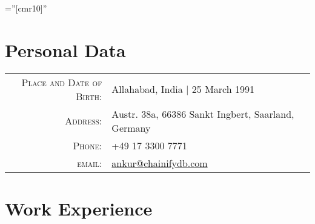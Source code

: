 \documentclass[a4paper,10pt]{article} %
\begin{document}
\pagestyle{empty} %

\font\fb=''[cmr10]'' %

\vspace{-2.5cm}
\par{\bigskip\par} %

\section{Personal Data}

\begin{tabular}{rl}
\textsc{Place and Date of Birth:} & Allahabad, India  | 25 March 1991 \\
\textsc{Address:} & Austr. 38a, 66386 Sankt Ingbert, Saarland, Germany \\
\textsc{Phone:} & +49 17 3300 7771\\
\textsc{email:} & \href{mailto:ankur@chainifydb.com}{ankur@chainifydb.com}
\end{tabular}


\section{Work Experience}
\end{document}
